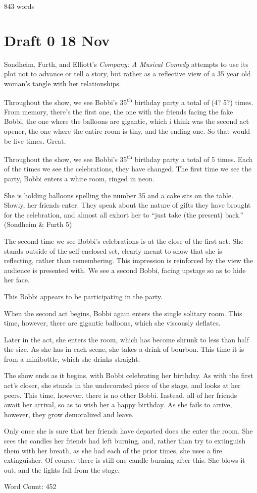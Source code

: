 \documentclass[12pt]{article}[titlepage]
\newcommand{\say}[1]{``#1''}
\newcommand{\1}{\={a}}
\newcommand{\2}{\={e}}
\newcommand{\3}{\={\i}}
\newcommand{\4}{\=o}
\newcommand{\5}{\=u}
\newcommand{\6}{\={A}}
\renewcommand{\,}{\textsuperscript{,}}
\begin{document}
843 words
\section{Draft 0 18 Nov}
Sondheim, Furth, and Elliott's \textit{Company: A Musical Comedy} attempts to use its plot not to advance or tell a story, but rather as a reflective view of a 35 year old woman's tangle with her relationships.

Throughout the show, we see Bobbi's 35\textsuperscript{th} birthday party a total of (4? 5?) times.
From memory, there's the first one, the one with the friends facing the fake Bobbi, the one where the balloons are gigantic, which i think was the second act opener, the one where the entire room is tiny, and the ending one.
So that would be five times.
Great.

Throughout the show, we see Bobbi's 35\textsuperscript{th} birthday party a total of 5 times.
Each of the times we see the celebrations, they have changed.
The first time we see the party, Bobbi enters a white room, ringed in neon.

She is holding balloons spelling the number 35 and a cake sits on the table.
Slowly, her friends enter.
They speak about the nature of gifts they have brought for the celebration, and almost all exhort her to \say{just take (the present) back.} (Sondheim \& Furth 5)

The second time we see Bobbi's celebrations is at the close of the first act.
She stands outside of the self-enclosed set, clearly meant to show that she is reflecting, rather than remembering.
This impression is reinforced by the view the audience is presented with.
We see a second Bobbi, facing upstage so as to hide her face.

This Bobbi appears to be participating in the party.

When the second act begins, Bobbi again enters the single solitary room.
This time, however, there are gigantic balloons, which she viscously deflates.

Later in the act, she enters the room, which has become shrunk to less than half the size.
As she has in each scene, she takes a drink of bourbon.
This time it is from a minibottle, which she drinks straight.

The show ends as it begins, with Bobbi celebrating her birthday.
As with the first act's closer, she stands in the undecorated piece of the stage, and looks at her peers.
This time, however, there is no other Bobbi.
Instead, all of her friends await her arrival, so as to wish her a happy birthday.
As she fails to arrive, however, they grow demoralized and leave.

Only once she is sure that her friends have departed does she enter the room.
She sees the candles her friends had left burning, and, rather than try to extinguish them with her breath, as she had each of the prior times, she uses a fire extinguisher.
Of course, there is still one candle burning after this.
She blows it out, and the lights fall from the stage.

Word Count: 452
\end{document}
